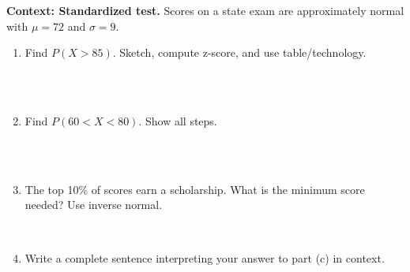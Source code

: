 \documentclass[10pt]{article}
\begin{document}
\begin{tcolorbox}[colback=redbg, colframe=black!40, boxrule=0.6pt, arc=2mm,
    left=3mm, right=3mm, top=2mm, bottom=2mm, title=\textbf{Tier A --- Approaching Proficiency}]
\textbf{Context: Standardized test.} Scores on a state exam are approximately normal
with $\mu = 72$ and $\sigma = 9$.

\begin{enumerate}
  \item Find $P(X > 85)$. Sketch, compute z-score, and use table/technology.
        \par\vspace{-\parskip}\nointerlineskip\noindent\begin{minipage}[t][1.1in][t]{\linewidth}\vspace*{2pt}\\
        \\
        \end{minipage}
  \item Find $P(60 < X < 80)$. Show all steps.
        \par\vspace{-\parskip}\nointerlineskip\noindent\begin{minipage}[t][1.1in][t]{\linewidth}\vspace*{2pt}\\
        \\
        \end{minipage}
  \item The top 10\% of scores earn a scholarship. What is the minimum score needed?
        Use inverse normal.
        \par\vspace{-\parskip}\nointerlineskip\noindent\begin{minipage}[t][0.9in][t]{\linewidth}\vspace*{2pt}\\
        \end{minipage}
  \item Write a complete sentence interpreting your answer to part (c) in context.
        \ansline{}\\
\end{enumerate}
\end{tcolorbox}
\end{document}
